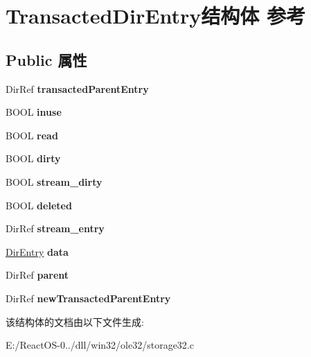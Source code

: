 \hypertarget{struct_transacted_dir_entry}{}\section{Transacted\+Dir\+Entry结构体 参考}
\label{struct_transacted_dir_entry}
\subsection*{Public 属性}
\begin{DoxyCompactItemize}
\item 
\mbox{\label{struct_transacted_dir_entry_a34218c9fcb75f217ee8cecb857f500bd}} 
Dir\+Ref {\bfseries transacted\+Parent\+Entry}
\item 
\mbox{\label{struct_transacted_dir_entry_addb540e7a166f2b5b51b4c48ed77d964}} 
B\+O\+OL {\bfseries inuse}
\item 
\mbox{\label{struct_transacted_dir_entry_ae3a6d1140a2a183738437d98b45f33bb}} 
B\+O\+OL {\bfseries read}
\item 
\mbox{\label{struct_transacted_dir_entry_a60c8ce3395a59d93894c9c5a16d003a3}} 
B\+O\+OL {\bfseries dirty}
\item 
\mbox{\label{struct_transacted_dir_entry_a17da19e833b16b8df7a77f914764f72e}} 
B\+O\+OL {\bfseries stream\+\_\+dirty}
\item 
\mbox{\label{struct_transacted_dir_entry_a38987a7b95f6e2b5e31118b87e44057d}} 
B\+O\+OL {\bfseries deleted}
\item 
\mbox{\label{struct_transacted_dir_entry_a6998fb9abf7bb9c86761d05141ab12cc}} 
Dir\+Ref {\bfseries stream\+\_\+entry}
\item 
\mbox{\label{struct_transacted_dir_entry_a17978a3e7a178e39ceeb3007a44ca3c0}} 
\hyperlink{struct_dir_entry}{Dir\+Entry} {\bfseries data}
\item 
\mbox{\label{struct_transacted_dir_entry_ac1298f32abbb563089dd58c9c58ae291}} 
Dir\+Ref {\bfseries parent}
\item 
\mbox{\label{struct_transacted_dir_entry_ae6e10858fd7deb24221bb1c5ee148ca3}} 
Dir\+Ref {\bfseries new\+Transacted\+Parent\+Entry}
\end{DoxyCompactItemize}


该结构体的文档由以下文件生成\+:\begin{DoxyCompactItemize}
\item 
E\+:/\+React\+O\+S-\/0../dll/win32/ole32/storage32.\+c\end{DoxyCompactItemize}
